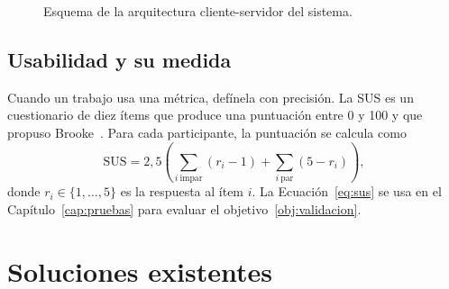 \begin{figure}[htbp]
  \centering
  \caption{Esquema de la arquitectura cliente-servidor del sistema.}
  \label{fig:cliente-servidor}
\end{figure}

\subsection{Usabilidad y su medida}
\label{sec:usabilidad}

Cuando un trabajo usa una métrica, defínela con precisión. La \ac{SUS} es un
cuestionario de diez ítems que produce una puntuación entre 0 y
100 y que propuso Brooke~\cite{brooke1996sus}. Para cada participante, la
puntuación se calcula como
\begin{equation}
  \mathrm{SUS} = 2{,}5 \left( \sum_{i\ \text{impar}} (r_i - 1)
               + \sum_{i\ \text{par}} (5 - r_i) \right),
  \label{eq:sus}
\end{equation}
donde $r_i \in \{1,\dots,5\}$ es la respuesta al ítem $i$. La
Ecuación~\eqref{eq:sus} se usa en el Capítulo~\ref{cap:pruebas} para evaluar el
objetivo~\ref{obj:validacion}.

\section{Soluciones existentes}
\label{sec:soluciones}

